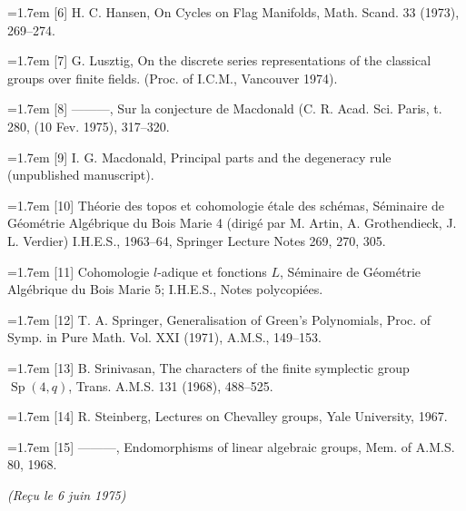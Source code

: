 \documentclass[9pt,twoside]{extarticle}
\begin{document}
{\noindent\hangindent=1.7em [6] H. C. Hansen, On Cycles on Flag Manifolds, Math. Scand. 33 (1973), 269--274.\par

\noindent\hangindent=1.7em [7] G. Lusztig, On the discrete series representations of the classical groups over finite fields. (Proc. of I.C.M., Vancouver 1974).\par

\noindent\hangindent=1.7em [8] ---------, Sur la conjecture de Macdonald (C. R. Acad. Sci. Paris, t. 280, (10 Fev. 1975), 317--320.\par

\noindent\hangindent=1.7em [9] I. G. Macdonald, Principal parts and the degeneracy rule (unpublished manuscript).\par

\noindent\hangindent=1.7em [10] Théorie des topos et cohomologie étale des schémas, Séminaire de Géométrie Algébrique du Bois Marie 4 (dirigé par M. Artin, A. Grothendieck, J. L. Verdier) I.H.E.S., 1963--64, Springer Lecture Notes 269, 270, 305.\par

\noindent\hangindent=1.7em [11] Cohomologie \(l\)-adique et fonctions \(L\), Séminaire de Géométrie Algébrique du Bois Marie 5; I.H.E.S., Notes polycopiées.\par

\noindent\hangindent=1.7em [12] T. A. Springer, Generalisation of Green's Polynomials, Proc. of Symp. in Pure Math. Vol. XXI (1971), A.M.S., 149--153.\par

\noindent\hangindent=1.7em [13] B. Srinivasan, The characters of the finite symplectic group \(\operatorname{Sp}(4,q)\), Trans. A.M.S. 131 (1968), 488--525.\par

\noindent\hangindent=1.7em [14] R. Steinberg, Lectures on Chevalley groups, Yale University, 1967.\par

\noindent\hangindent=1.7em [15] ---------, Endomorphisms of linear algebraic groups, Mem. of A.M.S. 80, 1968.\par

\medskip\noindent\itshape (Reçu le 6 juin 1975)\par\normalfont
}
\end{document}
